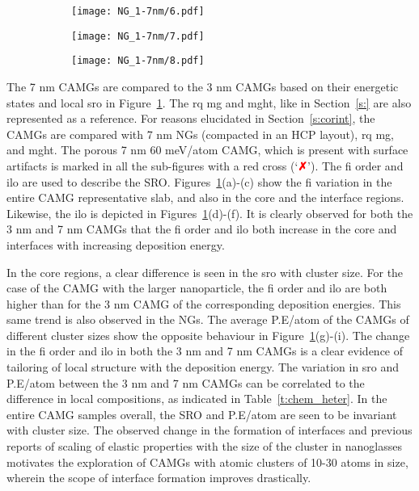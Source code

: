\begin{figure}[!ht] \centering
	\begin{subfigure}{\textwidth}
		\texttt{[image: NG\_1-7nm/6.pdf]}
	\end{subfigure}%
	\vfill
	\begin{subfigure}{\textwidth}
		\texttt{[image: NG\_1-7nm/7.pdf]}
	\end{subfigure}%
	\vfill
	\begin{subfigure}{\textwidth}
		\texttt{[image: NG\_1-7nm/8.pdf]}
	\end{subfigure}%
	\label{f:7nm-cibdeval}
\end{figure}

The 7 nm CAMGs are compared to the 3 nm CAMGs based on their energetic states and local \gls{sro} in Figure~\ref{f:7nm-cibdeval}. The \gls{rq} \gls{mg} and \gls{mght}, like in Section~\ref{s:} are also represented as a reference. For reasons elucidated in Section~\ref{s:corint}, the CAMGs are compared with 7 nm NGs (compacted in an HCP layout), \gls{rq} \gls{mg}, and \gls{mght}. The porous 7 nm 60 meV/atom CAMG, which is present with surface artifacts is marked in all the sub-figures with a red cross (`\textcolor{red}{\textbf{\faClose}}'). The \gls{fi} order and \gls{ilo} are used to describe the SRO. Figures~\ref{f:7nm-cibdeval}(a)-(c) show the \gls{fi} variation in the entire CAMG representative slab, and also in the core and the interface regions. Likewise, the \gls{ilo} is depicted in Figures~\ref{f:7nm-cibdeval}(d)-(f). It is clearly observed for both the 3 nm and 7 nm CAMGs that the \gls{fi} order and \gls{ilo} both increase in the core and interfaces with increasing deposition energy. \par

In the core regions, a clear difference is seen in the \gls{sro} with cluster size. For the case of the CAMG with the larger nanoparticle, the \gls{fi} order and \gls{ilo} are both higher than for the 3 nm CAMG of the corresponding deposition energies. This same trend is also observed in the NGs. The average P.E/atom of the CAMGs of different cluster sizes show the opposite behaviour in Figure~\ref{f:7nm-cibdeval}(g)-(i). The change in the \gls{fi} order and \gls{ilo} in both the 3 nm and 7 nm CAMGs is a clear evidence of tailoring of local structure with the deposition energy. The variation in \gls{sro} and P.E/atom between the 3 nm and 7 nm CAMGs can be correlated to the difference in local compositions, as indicated in Table~\ref{t:chem_heter}. In the entire CAMG samples overall, the SRO and P.E/atom are seen to be invariant with cluster size. The observed change in the formation of interfaces and previous reports of scaling of elastic properties with the size of the cluster in nanoglasses \cite{Cheng2019a} motivates the exploration of CAMGs with atomic clusters of 10-30 atoms in size, wherein the scope of interface formation improves drastically. \par 

